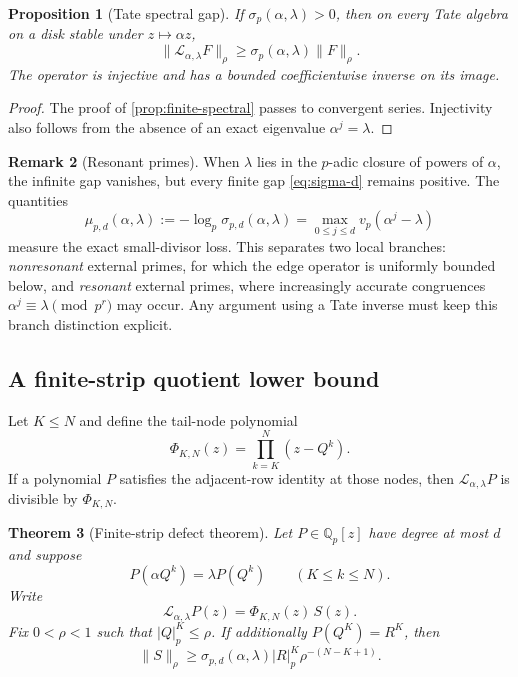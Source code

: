 \documentclass[11pt,oneside]{article}
\newtheorem{theorem}{Theorem}[section]
\newtheorem{proposition}[theorem]{Proposition}
\theoremstyle{definition}
\newtheorem{remark}[theorem]{Remark}
\newcommand{\Qp}{\mathbb Q_p}
\newcommand{\vp}{v_p}
\begin{document}
\begin{proposition}[Tate spectral gap]\label{prop:tate-gap}
If $\sigma_p(\alpha,\lambda)>0$, then on every Tate algebra on a disk stable under
$z\mapsto\alpha z$,
\begin{equation}\label{eq:tate-gap}
 \lVert\mathcal L_{\alpha,\lambda}F\rVert_\rho
 \ge\sigma_p(\alpha,\lambda)\lVert F\rVert_\rho.
\end{equation}
The operator is injective and has a bounded coefficientwise inverse on its image.
\end{proposition}

\begin{proof}
The proof of \cref{prop:finite-spectral} passes to convergent series.  Injectivity also follows
from the absence of an exact eigenvalue $\alpha^j=\lambda$.
\end{proof}

\begin{remark}[Resonant primes]
When $\lambda$ lies in the $p$-adic closure of powers of $\alpha$, the infinite gap vanishes,
but every finite gap \eqref{eq:sigma-d} remains positive.  The quantities
\[
 \mu_{p,d}(\alpha,\lambda)
 :=-\log_p\sigma_{p,d}(\alpha,\lambda)
 =\max_{0\le j\le d}\vp(\alpha^j-\lambda)
\]
measure the exact small-divisor loss.  This separates two local branches:
\emph{nonresonant} external primes, for which the edge operator is uniformly bounded below,
and \emph{resonant} external primes, where increasingly accurate congruences
$\alpha^j\equiv\lambda\pmod{p^r}$ may occur.  Any argument using a Tate inverse must keep this
branch distinction explicit.
\end{remark}

\subsection{A finite-strip quotient lower bound}

Let $K\le N$ and define the tail-node polynomial
\begin{equation}\label{eq:PhiKN}
 \Phi_{K,N}(z)=\prod_{k=K}^{N}(z-Q^k).
\end{equation}
If a polynomial $P$ satisfies the adjacent-row identity at those nodes, then
$\mathcal L_{\alpha,\lambda}P$ is divisible by $\Phi_{K,N}$.

\begin{theorem}[Finite-strip defect theorem]\label{thm:finite-strip}
Let $P\in\Qp[z]$ have degree at most $d$ and suppose
\begin{equation}\label{eq:finite-strip-hyp}
 P(\alpha Q^k)=\lambda P(Q^k)
 \qquad(K\le k\le N).
\end{equation}
Write
\begin{equation}\label{eq:defect-factorization}
 \mathcal L_{\alpha,\lambda}P(z)
 =\Phi_{K,N}(z)\,S(z).
\end{equation}
Fix $0<\rho<1$ such that $|Q|_p^K\le\rho$.  If additionally
$P(Q^K)=R^K$, then
\begin{equation}\label{eq:defect-lower}
 \lVert S\rVert_\rho
 \ge
 \sigma_{p,d}(\alpha,\lambda)
 |R|_p^K\rho^{-(N-K+1)}.
\end{equation}
\end{theorem}
\end{document}
